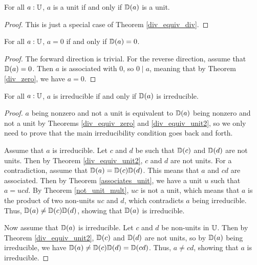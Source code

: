 \documentclass[../../math.tex]{subfiles}
\begin{document}
\begin{theorem} \label{div_equiv_unit2}
    For all $a : \mathbb{U}$, $a$ is a unit if and only if $\mathbb{D}(a)$ is a unit.
\end{theorem}
\begin{proof}
    This is just a special case of Theorem \ref{div_equiv_div}.
\end{proof}

\begin{theorem} \label{div_equiv_zero}
    For all $a : \mathbb{U}$, $a = 0$ if and only if $\mathbb{D}(a) = 0$.
\end{theorem}
\begin{proof}
    The forward direction is trivial.  For the reverse direction, assume that
    $\mathbb{D}(a) = 0$.  Then $a$ is associated with $0$, so $0 \mid a$, meaning that
    by Theorem \ref{div_zero}, we have $a = 0$.
\end{proof}

\begin{theorem} \label{div_equiv_irreducible}
    For all $a : \mathbb{U}$, $a$ is irreducible if and only if $\mathbb{D}(a)$ is irreducible.
\end{theorem}
\begin{proof}
    $a$ being nonzero and not a unit is equivalent to $\mathbb{D}(a)$ being nonzero and
    not a unit by Theorems \ref{div_equiv_zero} and \ref{div_equiv_unit2}, so we
    only need to prove that the main irreducibility condition goes back and
    forth.

    Assume that $a$ is irreducible.  Let $c$ and $d$ be such that $\mathbb{D}(c)$ and
    $\mathbb{D}(d)$ are not units.  Then by Theorem \ref{div_equiv_unit2}, $c$ and $d$
    are not units.  For a contradiction, assume that $\mathbb{D}(a) = \mathbb{D}(c) \mathbb{D}(d)$.
    This means that $a$ and $cd$ are associated.  Then by Theorem
    \ref{associates_unit}, we have a unit $u$ such that $a = ucd$.  By Theorem
    \ref{not_unit_mult}, $uc$ is not a unit, which means that $a$ is the product
    of two non-units $uc$ and $d$, which contradicts $a$ being irreducible.
    Thus, $\mathbb{D}(a) \neq \mathbb{D}(c) \mathbb{D}(d)$, showing that $\mathbb{D}(a)$ is irreducible.

    Now assume that $\mathbb{D}(a)$ is irreducible.  Let $c$ and $d$ be non-units in
    $\mathbb{U}$.  Then by Theorem \ref{div_equiv_unit2}, $\mathbb{D}(c)$ and $\mathbb{D}(d)$ are not
    units, so by $\mathbb{D}(a)$ being irreducible, we have $\mathbb{D}(a) \neq \mathbb{D}(c) \mathbb{D}(d) =
    \mathbb{D}(cd)$.  Thus, $a \neq cd$, showing that $a$ is irreducible.
\end{proof}
\end{document}
